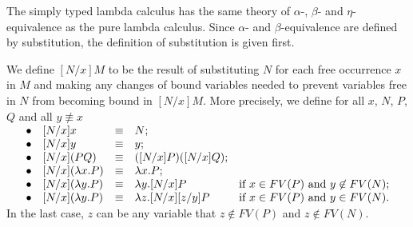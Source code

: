 The simply typed lambda calculus has the same theory of $ \alpha $-, $ \beta $- and $ \eta $-equivalence as the pure lambda calculus. Since $ \alpha $- and $ \beta $-equivalence are defined by substitution, the definition of substitution is given first.

\begin{definition}
\label{definition:substitution}
We define $ [N/x]M $ to be the result of substituting $ N $ for each free occurrence $ x $ in $ M $ and making any changes of bound variables needed to prevent variables free in $ N $ from becoming bound in $ [N/x]M $. More precisely, we define for all $ x $, $ N $, $ P $, $ Q $ and all $ y \not\equiv x $\\
$
\begin{array}{rllll}
\hspace*{12pt} \bullet & [N/x]x & \equiv & N; & \\
\bullet & [N/x]y & \equiv & y; & \\
\bullet & [N/x](PQ) & \equiv & ([N/x]P)([N/x]Q); & \\
\bullet & [N/x](\lambda x.P) & \equiv & \lambda x.P; & \\
\bullet & [N/x](\lambda y.P) & \equiv & \lambda y.[N/x]P & \text{if } x \in FV(P) \text{ and } y \not\in FV(N); \\
\bullet & [N/x](\lambda y.P) & \equiv & \lambda z.[N/x][z/y]P & \text{if } x \in FV(P) \text{ and } y \in FV(N). \\
\end{array}
$
In the last case, $ z $ can be any variable that $ z \not\in FV(P) $ and $ z \not\in FV(N) $.
\end{definition}

